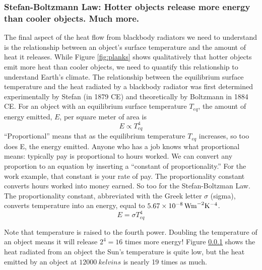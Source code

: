 \documentclass[amstex,12pt]{book}
\begin{document}
\subsubsection{Stefan-Boltzmann Law: Hotter objects release more energy than cooler objects. Much more.}
The final aspect of the heat flow from blackbody radiators we need to understand is the relationship between an object's surface temperature and the amount of heat it releases. While Figure \ref{fig:planks} shows qualitatively that hotter objects emit more heat than cooler objects, we need to quantify this relationship to understand Earth's climate. The relationship between the equilibrium surface temperature and the heat radiated by a blackbody radiator was first determined experimentally by Stefan (in 1879 CE) and theoretically by Boltzmann in 1884 CE. For an object with an equilibrium surface temperature $T_{eq}$, the amount of energy emitted, $E$, per square meter of area is
\begin{equation}
	E\propto T^4_{eq}
\end{equation}
``Proportional'' means that as the equilibrium temperature $T_{eq}$ increases, so too does E, the energy emitted. Anyone who has a job knows what proportional means: typically pay is proportional to hours worked. We can convert any proportion to an equation by inserting a ``constant of proportionality.'' For the work example, that constant is your rate of pay. The proportionality constant converts hours worked into money earned. So too for the Stefan-Boltzman Law. The proportionality constant, abbreviated with the Greek letter $\sigma$ (sigma), converts temperature into an energy, equal to $\SI{5.67d-8}{\watt\meter^{-2}\kelvin^{-4}}$.
\begin{equation}
	E=\sigma T^4_{eq}
\end{equation}

Note that temperature is raised to the fourth power. Doubling the temperature of an object means it will release $2^4=16$ times more energy! Figure \ref{} shows the heat radiated from an object the Sun's temperature is quite low, but the heat emitted by an object at $\SI{12000}{kelvins}$ is nearly 19 times as much. 
\end{document}
